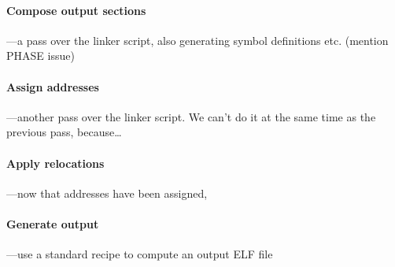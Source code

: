 \paragraph{Compose output sections} ---a pass over the linker script, 
      also generating symbol definitions etc. (mention PHASE issue)


\paragraph{Assign addresses} ---another pass over the linker script.
We can't do it at the same time as the previous pass, because\ldots{}

\paragraph{Apply relocations} ---now that addresses have been assigned, 

\paragraph{Generate output} ---use a standard recipe to compute an output ELF file 
